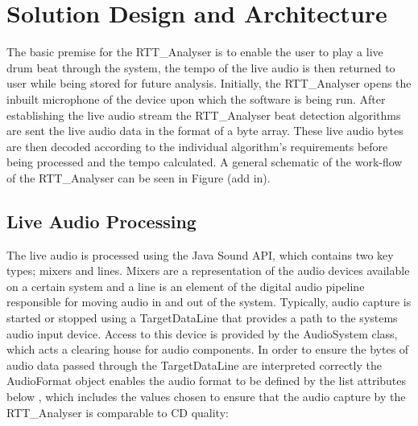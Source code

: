 \documentclass[a4paper, 11pt]{article}
\begin{document}
\maketitle{} \section{Solution Design and Architecture}
The basic premise for the RTT\_Analyser is to enable the user to play a live drum beat through the system, the tempo of the live audio is then returned to user while being stored for future analysis. Initially, the RTT\_Analyser opens the inbuilt microphone of the device upon which the software is being run. After establishing the live audio stream the RTT\_Analyser beat detection algorithms are sent the live audio data in the format of a byte array. These live audio bytes are then decoded according to the individual algorithm's requirements before being processed and the tempo calculated. A general schematic of the work-flow of the RTT\_Analyser can be seen in Figure (add in).

\subsection{Live Audio Processing}
\label{sec: liveaudio}
The live audio is processed using the Java Sound API, which contains two key types; mixers and lines. Mixers are a representation of the audio devices available on a certain system and a line is an element of the digital audio pipeline responsible for moving audio in and out of the system. Typically, audio capture is started or stopped using a TargetDataLine that provides a path to the systems audio input device. Access to this device is provided by the AudioSystem class, which acts a clearing house for audio components. In order to ensure the bytes of audio data passed through the TargetDataLine are interpreted correctly the AudioFormat object enables the audio format to be defined by the list attributes below \cite{javasound}, which includes the values chosen to ensure that the audio capture by the RTT\_Analyser is comparable to CD quality:
\end{document}
